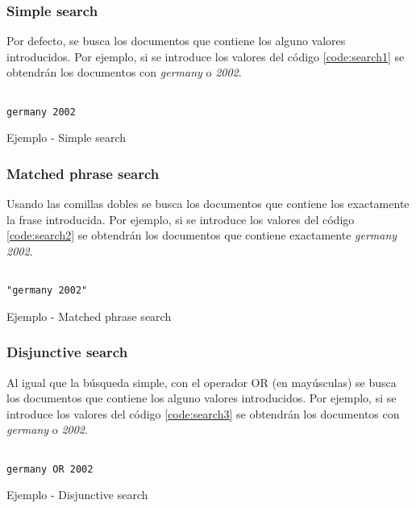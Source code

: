 \subsubsection{Simple search}
Por defecto, se busca los documentos que contiene los alguno valores introducidos. Por ejemplo, si se introduce los valores del código \ref{code:search1} se obtendrán los documentos con \textit{germany} o \textit{2002}.

\begin{listing}[H]
\begin{verbatim}
	
germany 2002
\end{verbatim}
	\caption{Ejemplo - Simple search}
	\label{code:search1}
\end{listing}

\subsubsection{Matched phrase search}
Usando las comillas dobles se busca los documentos que contiene los exactamente la frase introducida. Por ejemplo, si se introduce los valores del código \ref{code:search2} se obtendrán los documentos que contiene exactamente \textit{germany 2002}.

\begin{listing}[H]
\begin{verbatim}
	
"germany 2002"
\end{verbatim}
	\caption{Ejemplo - Matched phrase search}
	\label{code:search2}
\end{listing}


\subsubsection{Disjunctive search}
Al igual que la búsqueda simple, con el operador OR (en mayúsculas) se busca los documentos que contiene los alguno valores introducidos. Por ejemplo, si se introduce los valores del código \ref{code:search3} se obtendrán los documentos con \textit{germany} o \textit{2002}.

\begin{listing}[H]
\begin{verbatim}
	
germany OR 2002
\end{verbatim}
	\caption{Ejemplo - Disjunctive search}
	\label{code:search3}
\end{listing}

